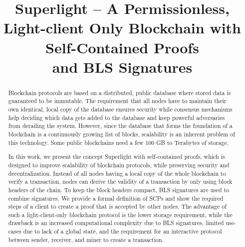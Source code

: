 \documentclass[conference]{IEEEtran}
\begin{document}
\title{Superlight -- A Permissionless, Light-client Only Blockchain with Self-Contained Proofs \\and BLS Signatures}

\author{
}

\maketitle
	
\begin{abstract}
Blockchain protocols are based on a distributed, public database where stored data is guaranteed to be immutable. The requirement that all nodes have to maintain their own identical, local copy of the database ensures security while consensus mechanisms help deciding which data gets added to the database and keep powerful adversaries from derailing the system. However, since the database that forms the foundation of a blockchain is a continuously growing list of blocks, scalability is an inherent problem of this technology. Some public blockchains need a few 100 GB to Terabytes of storage.

In this work, we present the concept Superlight with self-contained proofs, which is designed to improve scalability of blockchain protocols, while preserving security and decentralization. Instead of all nodes having a local copy of the whole blockchain to verify a transaction, nodes can derive the validity of a transaction by only using block headers of the chain. To keep the block headers compact, BLS signatures are used to combine signatures. We provide a formal definition of SCPs and show the required steps of a client to create a proof that is accepted by other nodes. The advantage of such a light-client-only blockchain protocol is the lower storage requirement, while the drawback is an increased computational complexity due to BLS signatures, limited use-cases due to lack of a global state, and the requirement for an interactive protocol between sender, receiver, and miner to create a transaction.
\end{abstract}
\end{document}
